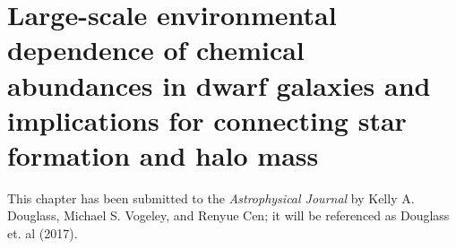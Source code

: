 \chapter{Large-scale environmental dependence of chemical abundances in dwarf galaxies and implications for connecting star formation and halo mass}


This chapter has been submitted to the \emph{Astrophysical Journal} by Kelly A. 
Douglass, Michael S. Vogeley, and Renyue Cen; it will be referenced as Douglass 
et. al (2017).